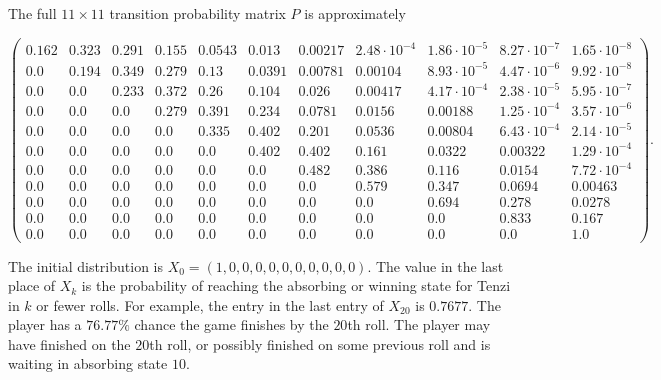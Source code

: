 \documentclass[12pt]{article}
\begin{document}
The full \( 11 \times 11 \) transition probability matrix \( P \) is
approximately
\begin{tiny}
    \[
        \begin{pmatrix}
            0.162 & 0.323 & 0.291 & 0.155 & 0.0543 & 0.013 & 0.00217 &
            2.48 \cdot {10^{-4}} & 1.86 \cdot {10^{-5}} & 8.27 \cdot {10^
            {-7}} & 1.65 \cdot {10^{-8}}\\
            0.0 & 0.194 & 0.349 & 0.279 & 0.13 & 0.0391 & 0.00781 &
            0.00104 & 8.93 \cdot {10^{-5}} & 4.47 \cdot {10^{-6}} & 9.92
            \cdot {10^{-8}}\\
            0.0 & 0.0 & 0.233 & 0.372 & 0.26 & 0.104 & 0.026 & 0.00417 &
            4.17 \cdot {10^{-4}} & 2.38 \cdot {10^{-5}} & 5.95 \cdot {10^
            {-7}}\\
            0.0 & 0.0 & 0.0 & 0.279 & 0.391 & 0.234 & 0.0781 & 0.0156 &
            0.00188 & 1.25 \cdot {10^{-4}} & 3.57 \cdot {10^{-6}}\\
            0.0 & 0.0 & 0.0 & 0.0 & 0.335 & 0.402 & 0.201 & 0.0536 &
            0.00804 & 6.43 \cdot {10^{-4}} & 2.14 \cdot {10^{-5}}\\
            0.0 & 0.0 & 0.0 & 0.0 & 0.0 & 0.402 & 0.402 & 0.161 & 0.0322
            & 0.00322 & 1.29 \cdot {10^{-4}}\\
            0.0 & 0.0 & 0.0 & 0.0 & 0.0 & 0.0 & 0.482 & 0.386 & 0.116 &
            0.0154 & 7.72 \cdot {10^{-4}}\\
            0.0 & 0.0 & 0.0 & 0.0 & 0.0 & 0.0 & 0.0 & 0.579 & 0.347 &
            0.0694 & 0.00463\\
            0.0 & 0.0 & 0.0 & 0.0 & 0.0 & 0.0 & 0.0 & 0.0 & 0.694 &
            0.278 & 0.0278\\
            0.0 & 0.0 & 0.0 & 0.0 & 0.0 & 0.0 & 0.0 & 0.0 & 0.0 & 0.833
            & 0.167\\
            0.0 & 0.0 & 0.0 & 0.0 & 0.0 & 0.0 & 0.0 & 0.0 & 0.0 & 0.0 &
            1.0
        \end{pmatrix}
        .
    \]
\end{tiny}
The initial distribution is \( X_0 = (1,0,0,0,0,0,0,0,0,0,0) \).  The
value in the last place of \( X_k \) is the probability of reaching the
absorbing or winning state for Tenzi in \( k \) or fewer rolls.  For
example, the entry in the last entry of \( X_{20} \) is \( 0.7677 \).
The player has a \( 76.77\% \) chance the game finishes by the \( 20 \)th
roll.  The player may have finished on the \( 20 \)th roll, or possibly
finished on some previous roll and is waiting in absorbing state \( 10 \).
\end{document}
